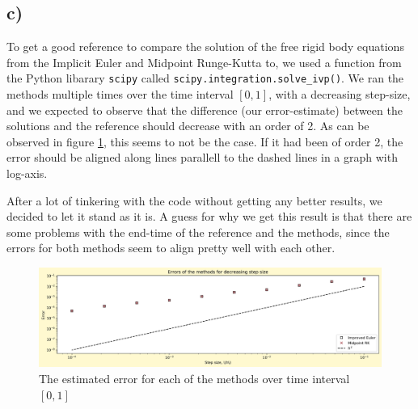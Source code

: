 \documentclass[12pt, a4paper,usenames,dvipsnames]{article}
\begin{document}
\subsection*{c)}
\lstset{language=Python}
To get a good reference to compare the solution of the free rigid body equations from the Implicit Euler and Midpoint Runge-Kutta to, we used a function from the Python libarary \lstinline{scipy} called \lstinline{scipy.integration.solve_ivp()}. We ran the methods multiple times over the time interval \([0,1]\), with a decreasing step-size, and we expected to observe that the difference (our error-estimate) between the solutions and the reference should decrease with an order of 2. As can be observed in figure \ref{fig:gr2c}, this seems to not be the case. If it had been of order 2, the error should be aligned along lines parallell to the dashed lines in a graph with log-axis. 

After a lot of tinkering with the code without getting any better results, we decided to let it stand as it is. A guess for why we get this result is that there are some problems with the end-time of the reference and the methods, since the errors for both methods seem to align pretty well with each other.
\begin{figure}[h]
    \centering
    \includegraphics[width=0.5\linewidth]{Graph2c.png}
    \caption{The estimated error for each of the methods over time interval \([0,1]\)}
    \label{fig:gr2c}
\end{figure}
\end{document}
